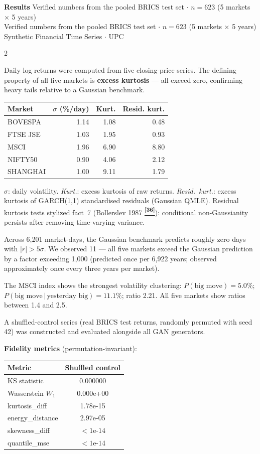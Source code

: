 \documentclass[10pt]{article}
\newcommand{\navybox}[2]{\begin{tcolorbox}[mybox={Navy}{LBg},title={#1}]#2\end{tcolorbox}}
\newcommand{\skybox}[2]{\begin{tcolorbox}[mybox={Sky}{BBg},title={#1}]#2\end{tcolorbox}}
\newcommand{\pagehead}[2]{%
  \begin{tcolorbox}[enhanced,arc=0pt,outer arc=0pt,boxrule=0pt,
    colback=Navy,colframe=Navy,
    top=5pt,bottom=5pt,left=8pt,right=8pt,
    before skip=0pt,after skip=10pt]
  {\color{white}\large\bfseries #1}%
  \ifx\relax#2\relax\else\\[1pt]{\color{blue!30!white}\small #2}\fi
  \hfill{\color{blue!20!white}\footnotesize Synthetic Financial Time Series $\cdot$ UPC}
  \end{tcolorbox}}
\newcommand{\tcite}[1]{%
  \hyperlink{R:#1}{\textsuperscript{\scriptsize\textbf{[#1]}}}}
\begin{document}
\clearpage

\pagehead{Results}
         {Verified numbers from the pooled BRICS test set $\cdot$ $n=623$ (5 markets $\times$ 5 years)}

\begin{multicols}{2}

\navybox{BRICS Data Characteristics (Table~1)}{%
Daily log returns were computed from five closing-price series. The defining property of all five markets is \textbf{excess kurtosis} --- all exceed zero, confirming heavy tails relative to a Gaussian benchmark.

\smallskip
\begin{tabular}{@{}lrrr@{}}
\toprule
Market & $\sigma$ (\%/day) & Kurt. & Resid. kurt. \\
\midrule
BOVESPA    & 1.14 & 1.08 & 0.48 \\
FTSE JSE   & 1.03 & 1.95 & 0.93 \\
MSCI       & 1.96 & 6.90 & 8.80 \\
NIFTY50    & 0.90 & 4.06 & 2.12 \\
SHANGHAI   & 1.00 & 9.11 & 1.79 \\
\bottomrule
\end{tabular}

\smallskip
\textit{$\sigma$}: daily volatility. \textit{Kurt.}: excess kurtosis of raw returns. \textit{Resid.\ kurt.}: excess kurtosis of GARCH(1,1) standardised residuals (Gaussian QMLE). Residual kurtosis tests stylized fact~7 (Bollerslev 1987\tcite{36}): conditional non-Gaussianity persists after removing time-varying variance.

Across 6,201 market-days, the Gaussian benchmark predicts roughly zero days with $|r|>5\sigma$. We observed 11 --- all five markets exceed the Gaussian prediction by a factor exceeding 1{,}000 (predicted once per 6,922 years; observed approximately once every three years per market).

The MSCI index shows the strongest volatility clustering: $P(\text{big move}) = 5.0\%$; $P(\text{big move}\,|\,\text{yesterday big}) = 11.1\%$; ratio 2.21. All five markets show ratios between 1.4 and 2.5.}

\skybox{Shuffled-Control Audit (Table~2)}{%
A shuffled-control series (real BRICS test returns, randomly permuted with seed 42) was constructed and evaluated alongside all GAN generators.

\smallskip
\textbf{Fidelity metrics} (permutation-invariant):
\begin{tabular}{@{}lc@{}}
\toprule
Metric & Shuffled control \\
\midrule
KS statistic         & 0.000000 \\
Wasserstein $W_1$    & 0.000e+00 \\
kurtosis\_diff       & 1.78e-15 \\
energy\_distance     & 2.97e-05 \\
skewness\_diff       & $<1\text{e-14}$ \\
quantile\_mse        & $<1\text{e-14}$ \\
\bottomrule
\end{tabular}

}
\end{multicols}
\end{document}
